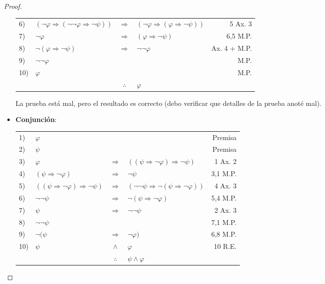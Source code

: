 \documentclass[12pt]{report}
\theoremstyle{largebreak}
\begin{document}
\begin{proof}
\begin{itemize}
\begin{center}
\begin{tabular}{l l c l r}
                    6) & $(\neg\varphi\Rightarrow(\neg\neg\varphi\Rightarrow\neg\psi))$ & $\Rightarrow$ & $(\neg\varphi\Rightarrow(\varphi\Rightarrow\neg\psi))$ &  5 Ax. 3 \\
                    7) & $\neg\varphi$ & $\Rightarrow$ & $(\varphi\Rightarrow\neg\psi)$ &  6,5 M.P. \\
                    8) & $\neg(\varphi\Rightarrow\neg\psi)$ & $\Rightarrow$ & $\neg\neg\varphi$ &  Ax. 4 + M.P. \\
                    9) & $\neg\neg\varphi$ &  &  &  M.P. \\
                    10) & $\varphi$ &  &  &  M.P. \\
                    \hline
                    & & $\therefore$ & $\varphi$ & \\
                \end{tabular}
            \end{center}
            La prueba está mal, pero el resultado es correcto (debo verificar que detalles de la prueba anoté mal).
            \item \textbf{Conjunción}:
            \begin{center}
                \begin{tabular}{l l c l r}
                    1) & $\varphi$ &  &  & Premisa \\
                    2) & $\psi$ &  &  & Premisa \\
                    3) & $\varphi$ & $\Rightarrow$ & $((\psi\Rightarrow\neg\varphi)\Rightarrow\neg\psi)$ & 1 Ax. 2 \\
                    4) & $(\psi\Rightarrow\neg\varphi)$ & $\Rightarrow$ & $\neg\psi$ & 3,1 M.P. \\
                    5) & $((\psi\Rightarrow\neg\varphi)\Rightarrow\neg\psi)$ & $\Rightarrow$ & $(\neg\neg\psi\Rightarrow\neg(\psi\Rightarrow\neg\varphi))$ & 4 Ax. 3\\
                    6) & $\neg\neg\psi$ & $\Rightarrow$ & $\neg(\psi\Rightarrow\neg\varphi)$ & 5,4 M.P.\\
                    7) & $\psi$ & $\Rightarrow$ & $\neg\neg\psi$ & 2 Ax. 3\\
                    8) & $\neg\neg\psi$ &  &  & 7,1 M.P.\\
                    9) & $\neg(\psi$ & $\Rightarrow$ & $\neg\varphi)$ & 6,8 M.P.\\
                    10) & $\psi$ & $\land$ & $\varphi$ & 10 R.E.\\
                    \hline
                    & & $\therefore$ & $\psi\land\varphi$ & \\
                \end{tabular}
            \end{center}
        \end{itemize}
    \end{proof}
\end{document}
